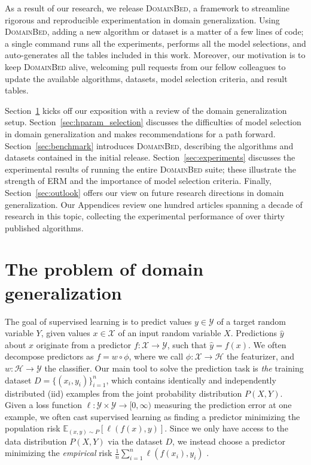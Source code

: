 \documentclass{article}
\newcommand{\domainbed}{\textsc{DomainBed}\xspace}
\begin{document}
As a result of our research, we release \domainbed, a framework to streamline rigorous and reproducible experimentation in domain generalization.
Using \domainbed, adding a new algorithm or dataset is a matter of a few lines of code; a single command runs all the experiments, performs all the model selections, and auto-generates all the tables included in this work.
Moreover, our motivation is to keep \domainbed alive, welcoming pull requests from our fellow colleagues to update the available algorithms, datasets, model selection criteria, and result tables. 

Section~\ref{sec:setup} kicks off our exposition with a review of the domain generalization setup.
Section~\ref{sec:hparam_selection} discusses the difficulties of model selection in domain generalization and makes recommendations for a path forward.
Section~\ref{sec:benchmark} introduces \domainbed, describing the algorithms and datasets contained in the initial release.
Section~\ref{sec:experiments} discusses the experimental results of running the entire \domainbed suite; these illustrate the strength of ERM and the importance of model selection criteria.
Finally, Section~\ref{sec:outlook} offers our view on future research directions in domain generalization.
Our Appendices review one hundred articles spanning a decade of research in this topic, collecting the experimental performance of over thirty published algorithms.

\section{The problem of domain generalization}
\label{sec:setup}

The goal of supervised learning is to predict values $y \in \mathcal{Y}$ of a target random variable $Y$, given values $x \in \mathcal{X}$ of an input random variable $X$.
Predictions $\hat{y}$ about $x$ originate from a predictor $f : \mathcal{X} \to \mathcal{Y}$, such that $\hat{y} = f(x)$.
We often decompose predictors as $f = w \circ \phi$, where we call $\phi : \mathcal{X} \to \mathcal{H}$ the featurizer, and $w : \mathcal{H} \to \mathcal{Y}$ the classifier.
Our main tool to solve the prediction task is \emph{the} training dataset $D = \{(x_i, y_i)\}_{i=1}^n$, which contains identically and independently distributed (iid) examples from the joint probability distribution $P(X, Y)$.
Given a loss function $\ell : \mathcal{Y} \times \mathcal{Y} \to [0, \infty)$ measuring the prediction error at one example, we often cast supervised learning as finding a predictor minimizing the population risk $\mathbb{E}_{(x, y) \sim P}[\ell(f(x), y)]$.
Since we only have access to the data distribution $P(X, Y)$ via the dataset $D$, we instead choose a predictor minimizing the \emph{empirical} risk $\frac{1}{n} \sum_{i=1}^n \ell(f(x_i), y_i)$
\citep{vapnik1998statistical}.
\end{document}
